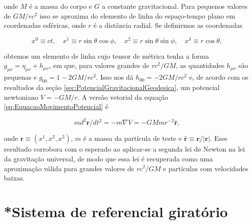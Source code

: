 onde $ M $ é a massa do corpo e $ G $ a constante gravitacional. Para pequenos valores de $ GM/rc^2 $ isso se aproxima do elemento de linha do espaço-tempo plano em coordenadas esféricas, onde $ r $ é a distância radial. Se definirmos as coordenadas

\[x^{0} \equiv c t, \quad x^{1} \equiv r \sin \theta \cos \phi, \quad x^{2} \equiv r \sin \theta \sin \phi, \quad x^{3} \equiv r \cos \theta,\]

obtemos um elemento de linha cujo tensor de métrica tenha a forma $ g_{\mu\nu} =\eta_{\mu \nu}+h_{\mu\nu} $, em que, para valores grandes de $ rc^2/GM $, as quantidades $ h_{\mu\nu} $ são pequenas e $ g_{00}=1-2GM/rc^2 $.  Isso nos dá $ h_{00} = -2GM/rc^2 $ e, de acordo com os resultados da seção \ref{sec:PotencialGravitacionalGeodesica}, um potencial newtoniano $ V = -GM/r $. A versão vetorial da equação \ref{eq:EquacaoMovimentoPotencial} é 

\[
m d^{2} \mathbf{r} / d t^{2}=-m \nabla V=-G M m r^{-2} \hat{\mathbf{r}}
,\]

onde $ \mathbf{r} \equiv\left(x^{1}, x^{2}, x^{3}\right) $, $ m $ é a massa da partícula de teste e $ \hat{\mathbf{r}}\equiv \mathbf{r}/|\mathbf{r}| $. Esse resultado corrobora com o esperado ao aplicar-se a segunda lei de Newton na lei da gravitação universal, de modo que essa lei é recuperada como uma aproximação válida para grandes valores de $ rc^2/GM $ e partículas com velocidades baixas.



\section{*Sistema de referencial giratório}\label{sec:SistemaReferencialGiratorio}
